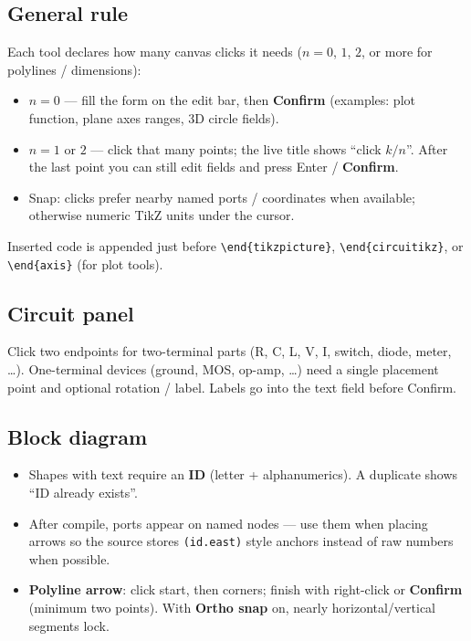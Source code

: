 \documentclass[a4paper]{ltxdoc}
\newcommand{\ui}[1]{\textbf{#1}}
\begin{document}
\subsection{General rule}
Each tool declares how many canvas clicks it needs ($n=0$, $1$, $2$,
or more for polylines / dimensions):

\begin{itemize}[nosep]
  \item $n=0$ --- fill the form on the edit bar, then \ui{Confirm}
        (examples: plot function, plane axes ranges, 3D circle fields).
  \item $n=1$ or $2$ --- click that many points; the live title shows
        ``click $k/n$''.  After the last point you can still edit fields
        and press Enter / \ui{Confirm}.
  \item Snap: clicks prefer nearby named ports / coordinates when
        available; otherwise numeric TikZ units under the cursor.
\end{itemize}

Inserted code is appended just before
\texttt{\textbackslash end\{tikzpicture\}},
\texttt{\textbackslash end\{circuitikz\}}, or
\texttt{\textbackslash end\{axis\}} (for plot tools).

\subsection{Circuit panel}
Click two endpoints for two-terminal parts (R, C, L, V, I, switch,
diode, meter, \ldots).  One-terminal devices (ground, MOS, op-amp, \ldots)
need a single placement point and optional rotation / label.  Labels go
into the text field before Confirm.

\subsection{Block diagram}
\begin{itemize}[nosep]
  \item Shapes with text require an \textbf{ID} (letter + alphanumerics).
        A duplicate shows ``ID already exists''.
  \item After compile, ports appear on named nodes --- use them when
        placing arrows so the source stores \texttt{(id.east)} style
        anchors instead of raw numbers when possible.
  \item \ui{Polyline arrow}: click start, then corners; finish with
        right-click or \ui{Confirm} (minimum two points).  With
        \ui{Ortho snap} on, nearly horizontal/vertical segments lock.
\end{itemize}
\end{document}
